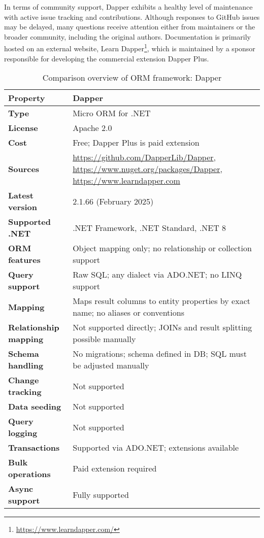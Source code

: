 In terms of community support, Dapper exhibits a healthy level of maintenance with active issue tracking and contributions. Although responses to GitHub issues may be delayed, many questions receive attention either from maintainers or the broader community, including the original authors. Documentation is primarily hosted on an external website, Learn Dapper\footnote{\url{https://www.learndapper.com/}}, which is maintained by a sponsor responsible for developing the commercial extension Dapper Plus.

\begin{table}[H]
\centering
\caption{Comparison overview of ORM framework: Dapper}
\begin{tabular}{|l|l|}
\toprule
\textbf{Property} & \textbf{Dapper} \\
\midrule
\textbf{Type} & Micro ORM for .NET \\
\textbf{License} & Apache 2.0 \\
\textbf{Cost} & Free; Dapper Plus is paid extension  \\
\textbf{Sources} & \url{https://github.com/DapperLib/Dapper}, \url{https://www.nuget.org/packages/Dapper}, \url{https://www.learndapper.com} \\
\textbf{Latest version} & 2.1.66 (February 2025) \\
\textbf{Supported .NET} & .NET Framework, .NET Standard, .NET 8 \\
\textbf{ORM features} & Object mapping only; no relationship or collection support \\
\textbf{Query support} & Raw SQL; any dialect via ADO.NET; no LINQ support \\
\textbf{Mapping} & Maps result columns to entity properties by exact name; no aliases or conventions \\
\textbf{Relationship mapping} & Not supported directly; JOINs and result splitting possible manually \\
\textbf{Schema handling} & No migrations; schema defined in DB; SQL must be adjusted manually \\
\textbf{Change tracking} & Not supported \\
\textbf{Data seeding} & Not supported \\
\textbf{Query logging} & Not supported \\
\textbf{Transactions} & Supported via ADO.NET; extensions available \\
\textbf{Bulk operations} & Paid extension required \\
\textbf{Async support} & Fully supported \\

\end{tabular}
\end{table}
